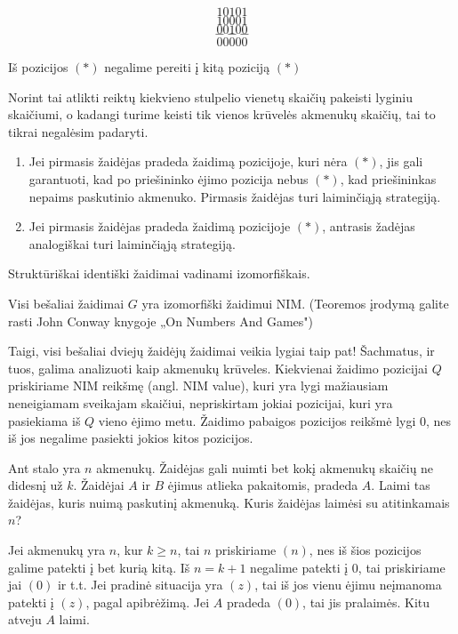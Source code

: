 $$10101$$$$10001$$$$00100$$$$---$$$$00000$$

\begin{teig}
  Iš pozicijos $(*)$ negalime pereiti į kitą poziciją $(*)$
\end{teig}

Norint tai atlikti reiktų kiekvieno stulpelio vienetų skaičių pakeisti
lyginiu skaičiumi, o kadangi turime keisti tik vienos krūvelės akmenukų
skaičių, tai to tikrai negalėsim padaryti.

\begin{enumerate}
  \item Jei pirmasis žaidėjas pradeda žaidimą pozicijoje, kuri nėra $(*)$,
    jis gali garantuoti, kad po priešininko ėjimo pozicija nebus $(*)$, kad
    priešininkas nepaims paskutinio akmenuko. Pirmasis žaidėjas turi
    laiminčiąją strategiją.
  \item Jei pirmasis žaidėjas pradeda žaidimą pozicijoje $(*)$, antrasis
    žadėjas analogiškai turi laiminčiąją strategiją. 
\end{enumerate}

\begin{api}
  Struktūriškai identiški žaidimai vadinami izomorfiškais. 
\end{api}

\begin{thm} 
  Visi bešaliai žaidimai $G$ yra izomorfiški žaidimui NIM. (Teoremos
  įrodymą galite rasti John Conway knygoje „On Numbers And Games")
\end{thm}

Taigi, visi bešaliai dviejų žaidėjų žaidimai veikia lygiai taip pat!
Šachmatus, ir tuos, galima analizuoti kaip akmenukų krūveles. Kiekvienai
žaidimo pozicijai $Q$ priskiriame NIM reikšmę (angl. NIM value), kuri yra
lygi mažiausiam neneigiamam sveikajam skaičiui, nepriskirtam jokiai
pozicijai, kuri yra pasiekiama iš $Q$ vieno ėjimo metu. Žaidimo pabaigos
pozicijos reikšmė lygi $0$, nes iš jos negalime pasiekti jokios kitos
pozicijos. 

\begin{pavnr}
  Ant stalo yra $n$ akmenukų. Žaidėjas gali nuimti bet kokį akmenukų
  skaičių ne didesnį už $k$. Žaidėjai $A$ ir $B$ ėjimus atlieka pakaitomis,
  pradeda $A$.  Laimi tas žaidėjas, kuris nuimą paskutinį akmenuką. Kuris
  žaidėjas laimėsi su atitinkamais $n$?
\end{pavnr}

Jei akmenukų yra $n$, kur $k \geq n$, tai $n$ priskiriame $(n)$, nes iš
šios pozicijos galime patekti į bet kurią kitą. Iš $n=k+1$ negalime patekti
į $0$, tai priskiriame jai $(0)$ ir t.t. Jei pradinė situacija yra $(z)$, tai iš
jos vienu ėjimu neįmanoma patekti į $(z)$, pagal apibrėžimą. Jei $A$ pradeda
$(0)$, tai jis pralaimės. Kitu atveju $A$ laimi.

